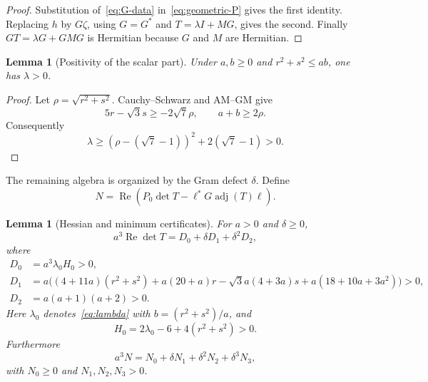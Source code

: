 \documentclass[11pt]{article}
\newtheorem{lemma}[theorem]{Lemma}
\theoremstyle{definition}
\newcommand{\Rea}{\operatorname{Re}}
\newcommand{\adj}{\operatorname{adj}}
\begin{document}
\begin{proof}
Substitution of~\eqref{eq:G-data} in~\eqref{eq:geometric-P} gives the first
identity.  Replacing $h$ by $G\zeta$, using $G=G^*$ and
$T=\lambda I+MG$, gives the second.  Finally
$GT=\lambda G+GMG$ is Hermitian because $G$ and $M$ are Hermitian.
\end{proof}

\begin{lemma}[Positivity of the scalar part]\label{lem:lambda-positive}
Under $a,b\geq0$ and $r^2+s^2\leq ab$, one has $\lambda>0$.
\end{lemma}

\begin{proof}
Let $\rho=\sqrt{r^2+s^2}$.  Cauchy--Schwarz and AM--GM give
\[
 5r-\sqrt3s\geq-2\sqrt7\rho,\qquad a+b\geq2\rho.
\]
Consequently
\[
 \lambda\geq(\rho-(\sqrt7-1))^2+2(\sqrt7-1)>0.
\]
\end{proof}

The remaining algebra is organized by the Gram defect $\delta$.  Define
\begin{equation}\label{eq:Ndef}
 N=\Rea\left(P_0\det T-\ell^*G\adj(T)\ell\right).
\end{equation}

\begin{lemma}[Hessian and minimum certificates]\label{lem:hessian-certs}
For $a>0$ and $\delta\geq0$,
\begin{equation}\label{eq:detT-expansion}
 a^3\Rea\det T=D_0+\delta D_1+\delta^2D_2,
\end{equation}
where
\begin{align}
 D_0&=a^3\lambda_0H_0>0,\nonumber\\
 D_1&=a\bigl((4+11a)(r^2+s^2)+a(20+a)r
 -\sqrt3a(4+3a)s+a(18+10a+3a^2)\bigr)>0,\label{eq:Dcoeffs}\\
 D_2&=a(a+1)(a+2)>0.
\end{align}
Here $\lambda_0$ denotes~\eqref{eq:lambda} with
$b=(r^2+s^2)/a$, and
\[
 H_0=2\lambda_0-6+4(r^2+s^2)>0.
\]
Furthermore
\begin{equation}\label{eq:N-expansion}
 a^3N=N_0+\delta N_1+\delta^2N_2+\delta^3N_3,
\end{equation}
with $N_0\geq0$ and $N_1,N_2,N_3>0$.
\end{lemma}
\end{document}
